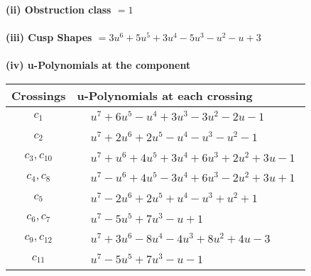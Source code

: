 \documentclass[1p]{elsarticle_modified}
\theoremstyle{definition}
\begin{document}
\flushleft \textbf{(ii) Obstruction class $= 1$}\\~\\
\flushleft \textbf{(iii) Cusp Shapes $= 3 u^6+5 u^5+3 u^4-5 u^3- u^2- u+3$}\\~\\
\newpage\renewcommand{\arraystretch}{1}
\flushleft \textbf{(iv) u-Polynomials at the component}\newline \\
\begin{tabular}{m{50pt}|m{274pt}}
Crossings & \hspace{64pt}u-Polynomials at each crossing \\
\hline $$\begin{aligned}c_{1}\end{aligned}$$&$\begin{aligned}
&u^7+6 u^5- u^4+3 u^3-3 u^2-2 u-1
\end{aligned}$\\
\hline $$\begin{aligned}c_{2}\end{aligned}$$&$\begin{aligned}
&u^7+2 u^6+2 u^5- u^4- u^3- u^2-1
\end{aligned}$\\
\hline $$\begin{aligned}c_{3},c_{10}\end{aligned}$$&$\begin{aligned}
&u^7+u^6+4 u^5+3 u^4+6 u^3+2 u^2+3 u-1
\end{aligned}$\\
\hline $$\begin{aligned}c_{4},c_{8}\end{aligned}$$&$\begin{aligned}
&u^7- u^6+4 u^5-3 u^4+6 u^3-2 u^2+3 u+1
\end{aligned}$\\
\hline $$\begin{aligned}c_{5}\end{aligned}$$&$\begin{aligned}
&u^7-2 u^6+2 u^5+u^4- u^3+u^2+1
\end{aligned}$\\
\hline $$\begin{aligned}c_{6},c_{7}\end{aligned}$$&$\begin{aligned}
&u^7-5 u^5+7 u^3- u+1
\end{aligned}$\\
\hline $$\begin{aligned}c_{9},c_{12}\end{aligned}$$&$\begin{aligned}
&u^7+3 u^6-8 u^4-4 u^3+8 u^2+4 u-3
\end{aligned}$\\
\hline $$\begin{aligned}c_{11}\end{aligned}$$&$\begin{aligned}
&u^7-5 u^5+7 u^3- u-1
\end{aligned}$\\
\hline
\end{tabular}\\~\\
\end{document}

